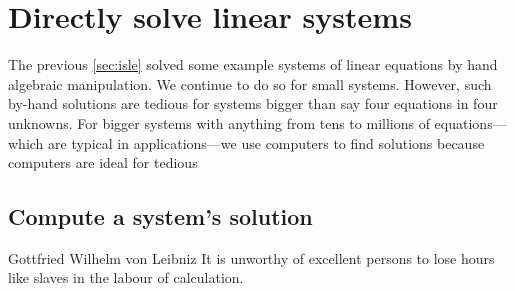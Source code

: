 
\section{Directly solve linear systems}
\label{sec:dmsls}
\secttoc
{}

The previous \cref{sec:isle} solved some example systems of linear equations by hand algebraic manipulation.  
We  continue to do so for small systems.  
However, such by-hand solutions are tedious for systems bigger than say four equations in four unknowns.  
For bigger systems with anything from tens to millions of equations---which are typical in applications---we use computers to find solutions because computers are ideal for tedious 


\subsection{Compute a system's solution}

\begin{quoted}{Gottfried Wilhelm von Leibniz}
It is unworthy of excellent persons to lose hours like slaves in the labour of calculation.
\end{quoted}

